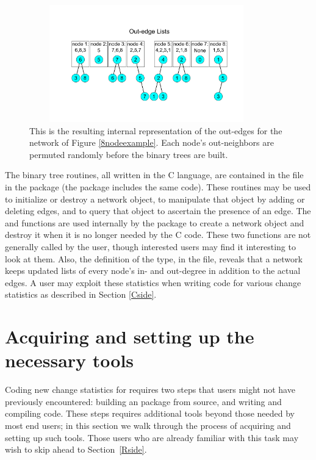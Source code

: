 \documentclass[article]{jss}
\begin{document}
\begin{figure}[htb]
\includegraphics[height=2in, width=4in]{outedgelists.pdf}
\caption{This is the resulting internal representation of the out-edges for the network of
Figure \ref{8nodeexample}.  Each node's out-neighbors are permuted randomly
before the binary trees are built.}\label{outedgefig}
\end{figure}

The binary tree routines, all written in the C language, are contained in the
 file in the  package (the  package
includes the same code).  These routines may be used to initialize or destroy
a network object, to manipulate that object by adding or deleting edges, and to
query that object to ascertain the presence of an edge.
The  and  functions
are used internally by the  package to create a network object
and destroy it when it is no longer needed by the C code.  These two functions
are not generally called by the user, though interested users may find it interesting
to look at them.  Also, the definition of the  type, in the
 file, reveals that a network keeps updated lists of every node's
in- and out-degree in addition to the actual edges.  A user may exploit these statistics
when writing code for various change statistics as described in Section \ref{Cside}.

\section{Acquiring and setting up the necessary tools}
\label{Tools}

Coding new change statistics for  requires two steps that users might not have previously encountered: building an  package from source, and writing and compiling  code. These steps requires additional tools beyond those needed by most  end users; in this section we walk through the process of acquiring and setting up such tools. Those users who are already familiar with this task may wish to skip ahead to Section~\ref{Rside}.
\end{document}
